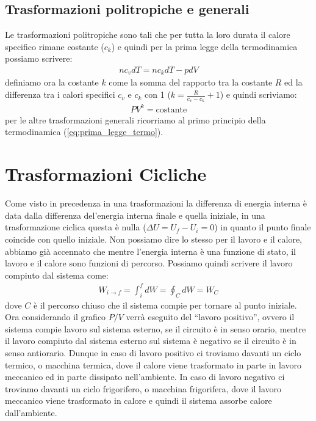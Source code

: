     \subsection{Trasformazioni politropiche e generali}
        Le trasformazioni politropiche sono tali che per tutta la loro durata il calore specifico rimane costante ($c_k$) e quindi per la prima legge della termodinamica possiamo scrivere:
        \begin{align*}
            nc_vdT = nc_kdT - pdV
        \end{align*}
        definiamo ora la costante $k$ come la somma del rapporto tra la costante $R$ ed la differenza tra i calori specifici $c_v$ e $c_k$ con 1 ($k=\frac{R}{c_v-c_k}+1$) e quindi scriviamo:
        \begin{align*}
            PV^{k} = \text{costante}
        \end{align*}
        per le altre trasformazioni generali ricorriamo al primo principio della termodinamica (\ref{eq:prima_legge_termo}).
\section{Trasformazioni Cicliche}
    Come visto in precedenza in una trasformazioni la differenza di energia interna è data dalla differenza del'energia interna finale e quella iniziale, in una trasformazione ciclica questa è nulla ($\Delta U = U_f - U_i = 0$) in quanto il punto finale coincide con quello iniziale. Non possiamo dire lo stesso per il lavoro e il calore, abbiamo già accennato che mentre l'energia interna è una funzione di stato, il lavoro e il calore sono funzioni di percorso. Possiamo quindi scrivere il lavoro compiuto dal sistema come:
    \begin{align*}
        W_{i\to f} = \int_{i}^{f} dW = \oint_{C} dW = W_C
    \end{align*}
    dove $C$ è il percorso chiuso che il sistema compie per tornare al punto iniziale. Ora considerando il grafico $P/V$ verrà eseguito del ``lavoro positivo'', ovvero il sistema compie lavoro sul sistema esterno, se il circuito è in senso orario, mentre il lavoro compiuto dal sistema esterno sul sistema è negativo se il circuito è in senso antiorario. \newline
    Dunque in caso di lavoro positivo ci troviamo davanti un ciclo termico, o macchina termica, dove il calore viene trasformato in parte in lavoro meccanico ed in parte dissipato nell'ambiente. In caso di lavoro negativo ci troviamo davanti un ciclo frigorifero, o macchina frigorifera, dove il lavoro meccanico viene trasformato in calore e quindi il sistema assorbe calore dall'ambiente.
